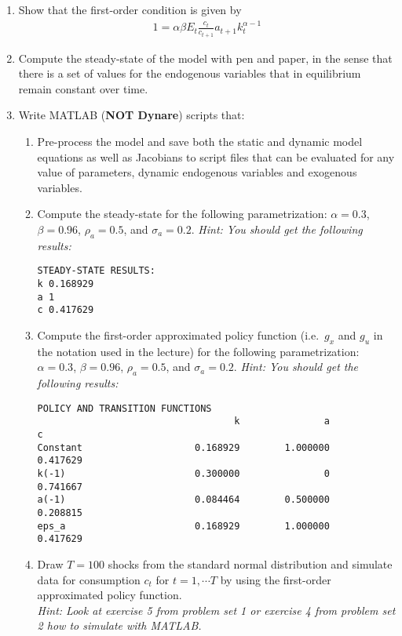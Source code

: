 \documentclass{article}
\begin{document}
\begin{enumerate}

\item
Show that the first-order condition is given by
\begin{align}
1 = \alpha \beta E_t \frac{c_{t}}{c_{t+1}} a_{t+1} k_{t}^{\alpha-1} \label{eq:BrockMirmanEuler}
\end{align}

\item
Compute the steady-state of the model with pen and paper,
  in the sense that there is a set of values for the endogenous variables that in equilibrium remain constant over time.

\item
Write MATLAB (\textbf{NOT Dynare}) scripts that:
\begin{enumerate}
\item
Pre-process the model and save both the static and dynamic model equations
  as well as Jacobians to script files that can be evaluated for any value of parameters,
  dynamic endogenous variables and exogenous variables.

\item
Compute the steady-state for the following parametrization:
\(\alpha=0.3\), \(\beta=0.96\), \(\rho_a=0.5\), and \(\sigma_a=0.2\).
\emph{Hint: You should get the following results:}
\begin{verbatim}
STEADY-STATE RESULTS:
k 0.168929
a 1
c 0.417629
\end{verbatim}

\item
Compute the first-order approximated policy function (i.e.\
  \(g_x\) and \(g_u\) in the notation used in the lecture)
  for the following parametrization:
  \(\alpha=0.3\), \(\beta=0.96\), \(\rho_a=0.5\), and \(\sigma_a=0.2\).
\emph{Hint: You should get the following results:}
\begin{verbatim}
POLICY AND TRANSITION FUNCTIONS
                                   k               a               c
Constant                    0.168929        1.000000        0.417629
k(-1)                       0.300000               0        0.741667
a(-1)                       0.084464        0.500000        0.208815
eps_a                       0.168929        1.000000        0.417629
\end{verbatim}

\item
Draw \(T=100\) shocks from the standard normal distribution and simulate data for consumption \(c_t\) for \(t=1,\cdots T\)
  by using the first-order approximated policy function.
\\\emph{Hint: Look at exercise 5 from problem set 1 or exercise 4 from problem set 2 how to simulate with MATLAB.}


\end{enumerate}
\end{enumerate}
\end{document}
